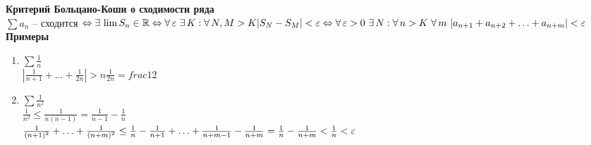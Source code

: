 \documentclass[12pt]{article}
\begin{document}
\textbf{Критерий Больцано-Коши о сходимости ряда}\\
$\sum a_n$ -- сходится $\Leftrightarrow \exists\, \lim S_n \in \mathbb{R} \Leftrightarrow \forall\, \varepsilon\ \exists\, K: \forall\, N,M > K |S_N-S_M| < \varepsilon \Leftrightarrow \forall\, \varepsilon > 0\ \exists\, N: \forall\, n>K\ \forall\, m\ |a_{n+1} + a_{n+2} + \ldots + a_{n+m}| < \varepsilon$\\
\textbf{Примеры}
\begin{enumerate}
    \item $\sum \frac1n$\\
    $|\frac1{n+1} + \ldots + \frac1{2n}| > n\frac1{2n} = frac12$
    \item $\sum \frac1{n^2}$\\
    $\frac1{n^2} \leq \frac1{n(n-1)} = \frac1{n-1}-\frac1n$\\
    $\frac1{(n+1)^2} + \ldots + \frac1{(n+m)^2} \leq \frac1n - \frac1{n+1} + \ldots + \frac1{n+m-1} - \frac1{n+m} = \frac1n - \frac1{n+m} < \frac1n < \varepsilon$
\end{enumerate}
\end{document}
